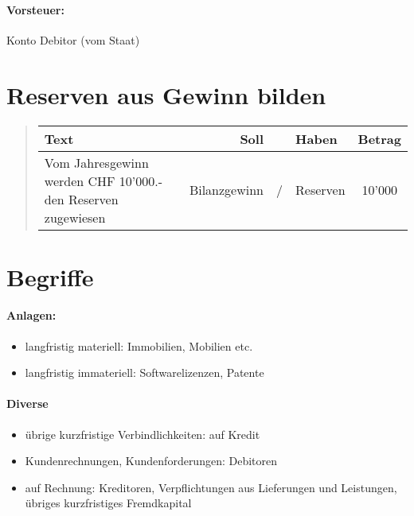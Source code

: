 \paragraph*{Vorsteuer: }

Konto Debitor (vom Staat)


\section*{Reserven aus Gewinn bilden}
\begin{verse}
\begin{tabular}{|l|r|c|l|c|}
\hline 
Text & Soll &  & Haben & Betrag\tabularnewline
\hline 
\hline 
Vom Jahresgewinn werden CHF 10'000.- den Reserven zugewiesen & Bilanzgewinn & / & Reserven & 10'000\tabularnewline
\hline 
\end{tabular}
\end{verse}

\section*{Begriffe}


\paragraph*{Anlagen:}
\begin{itemize}
\item langfristig materiell: Immobilien, Mobilien etc.
\item langfristig immateriell: Softwarelizenzen, Patente
\end{itemize}

\paragraph*{Diverse}
\begin{itemize}
\item übrige kurzfristige Verbindlichkeiten: auf Kredit
\item Kundenrechnungen, Kundenforderungen: Debitoren
\item auf Rechnung: Kreditoren, Verpflichtungen aus Lieferungen und Leistungen,
übriges kurzfristiges Fremdkapital\end{itemize}

